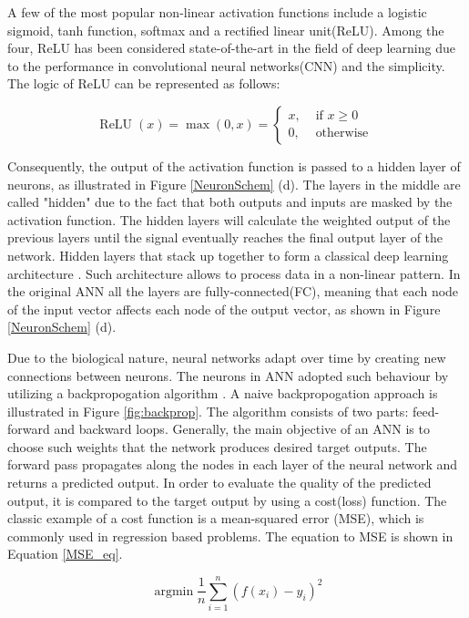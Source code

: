 A few of the most popular non-linear activation functions include a logistic sigmoid, tanh function, softmax and a rectified linear unit(ReLU). Among the four, ReLU has been considered state-of-the-art in the field of deep learning due to the performance in convolutional neural networks(CNN) \cite{Dubey2021} and the simplicity. The logic of ReLU can be represented as follows: 
  
\begin{equation}
	\operatorname{ReLU}(x)=\max (0, x)= \begin{cases}x, & \text { if } x \geq 0 \\ 0, & \text { otherwise }\end{cases}
\end{equation}

Consequently, the output of the activation function is passed to a hidden layer of neurons, as illustrated in Figure \ref{NeuronSchem} (d). The layers in the middle are called "hidden" due to the fact that both outputs and inputs are masked by the activation function.  The hidden layers will calculate the weighted output of the previous layers until the signal eventually reaches the final output layer of the network. Hidden layers that stack up together to form a classical deep learning architecture \cite{OShea2015}. Such architecture allows to process data in a non-linear pattern. In the original ANN all the layers are fully-connected(FC), meaning that each node of the input vector affects each node of the output vector, as shown in Figure \ref{NeuronSchem} (d).


Due to the biological nature, neural networks adapt over time by creating new connections between neurons. The neurons in ANN adopted such behaviour by utilizing a backpropogation algorithm \cite{Rumelhart:1986we}. A naive backpropogation approach is illustrated in Figure \ref{fig:backprop}. The algorithm consists of two parts: feed-forward and backward loops. Generally, the main objective of an ANN is to choose such weights that the network produces desired target outputs. The forward pass propagates along the nodes in each layer of the neural network and returns a predicted output. In order to evaluate the quality of the predicted output, it is compared to the target output by using a cost(loss) function. The classic example of a cost function is a mean-squared error (MSE), which is commonly used in regression based problems. The equation to MSE is shown in Equation \ref{MSE_eq}.

\begin{equation}\label{MSE_eq} 
{\operatorname{argmin}} \frac{1}{n} \sum_{i=1}^{n}\left(f\left(x_{i}\right)-y_{i}\right)^{2}
\end{equation}

